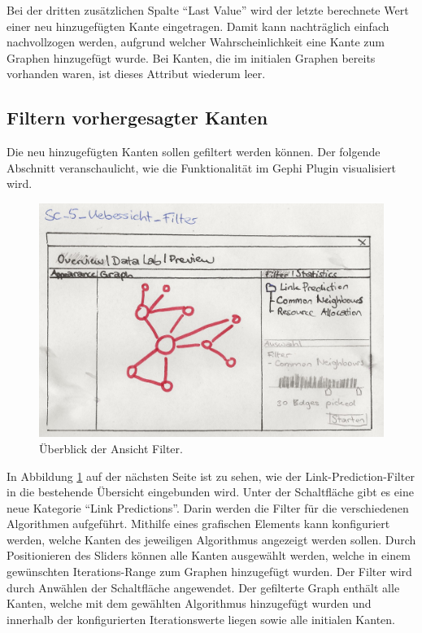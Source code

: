 Bei der dritten zusätzlichen Spalte ``Last Value'' wird der letzte berechnete Wert einer neu hinzugefügten Kante eingetragen.
Damit kann nachträglich einfach nachvollzogen werden, aufgrund welcher Wahrscheinlichkeit eine Kante zum Graphen hinzugefügt wurde.
Bei Kanten, die im initialen Graphen bereits vorhanden waren, ist dieses Attribut wiederum leer.

\subsection{Filtern vorhergesagter Kanten}

Die neu hinzugefügten Kanten sollen gefiltert werden können.
Der folgende Abschnitt veranschaulicht, wie die Funktionalität im Gephi Plugin visualisiert wird.

\begin{figure}
    \includegraphics[width=\linewidth]{resources/SC-5.png}
    \caption{Überblick der Ansicht Filter.}
    \label{fig:screen5}
\end{figure}

In Abbildung \ref{fig:screen5} auf der nächsten Seite ist zu sehen, wie der Link-Prediction-Filter in die bestehende Übersicht eingebunden wird.
Unter der Schaltfläche  gibt es eine neue Kategorie ``Link Predictions''.
Darin werden die Filter für die verschiedenen Algorithmen aufgeführt.
Mithilfe eines grafischen Elements kann konfiguriert werden, welche Kanten des jeweiligen Algorithmus angezeigt werden sollen.
Durch Positionieren des Sliders können alle Kanten ausgewählt werden, welche in einem gewünschten Iterations-Range zum Graphen hinzugefügt wurden.
Der Filter wird durch Anwählen der Schaltfläche  angewendet. Der gefilterte Graph enthält alle Kanten, welche mit dem gewählten Algorithmus hinzugefügt wurden und
innerhalb der konfigurierten Iterationswerte liegen sowie alle initialen Kanten.


